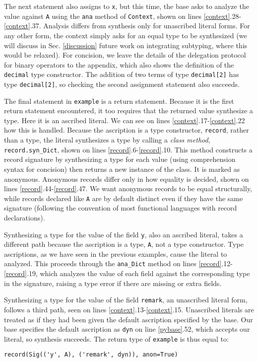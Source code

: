 \documentclass[10pt,preprint]{sigplanconf}
\begin{document}
{The next statement also assigns to \verb|x|, but this time, the base asks to analyze the value against \verb|A| using the \verb|ana| method of \verb|Context|, shown on lines \ref{context}.28-\ref{context}.37. Analysis differs from synthesis only for unascribed literal forms. For any other form, the context simply asks for an equal type to be synthesized (we will discuss in Sec. \ref{discussion} future work on integrating subtyping, where this would be relaxed). For concision, we leave the details of the delegation protocol for binary operators to the appendix, which also shows the definition of the \verb|decimal| type constructor. The addition of two terms of type \verb|decimal[2]| has type \verb|decimal[2]|, so checking the second assignment statement also succeeds.

The final statement in \verb|example| is a return statement. Because it is the first return statement encountered, it too requires that the returned value synthesize a type. Here it is an ascribed literal. We can see on lines \ref{context}.17-\ref{context}.22 how this is handled. Because the ascription is a type constructor, \verb|record|, rather than a type, the literal synthesizes a type by calling a \emph{class method}, \verb|record.syn_Dict|, shown on lines \ref{record}.6-\ref{record}.10. This method constructs a record signature by synthesizing a type for each value (using comprehension syntax for concision) then returns a new instance of the class. It is marked as anonymous. Anonymous records differ only in how equality is decided, shown on lines \ref{record}.44-\ref{record}.47. We want anonymous records to be equal structurally, while records declared like \verb|A| are by default distinct even if they have the same signature (following the convention of most functional languages with record declarations). 

Synthesizing a type for the value of the field \verb|y|, also an ascribed literal, takes a different path because the ascription is a type, \verb|A|, not a type constructor. Type ascriptions, as we have seen in the previous examples, cause the literal to analyzed. This proceeds through the \verb|ana_Dict| method on lines \ref{record}.12-\ref{record}.19, which analyzes the value of each field against the corresponding type in the signature, raising a type error if there are missing or extra fields. %

Synthesizing a type for the value of the field \verb|remark|, an unascribed literal form, follows a third path, seen on lines \ref{context}.13-\ref{context}.15. Unascribed literals are treated as if they had been  given the default ascription specified by the base. Our base specifies the default ascription as \verb|dyn| on line \ref{pybase}.52, which accepts our  literal, so synthesis succeeds. The return type of \verb|example| is thus equal to:
\begin{lstlisting}[numbers=none]
record(Sig(('y', A), ('remark', dyn)), anon=True)
\end{lstlisting}
\vspace{-10px}
}
\end{document}
